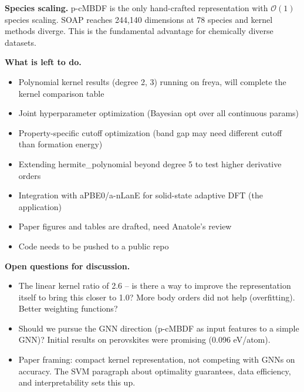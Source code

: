 \documentclass[11pt]{article}
\begin{document}
\textbf{Species scaling.} p-cMBDF is the only hand-crafted representation with $\mathcal{O}(1)$ species scaling. SOAP reaches 244,140 dimensions at 78 species and kernel methods diverge. This is the fundamental advantage for chemically diverse datasets.

\textbf{What is left to do.}
\begin{itemize}[nosep]
    \item Polynomial kernel results (degree 2, 3) running on freya, will complete the kernel comparison table
    \item Joint hyperparameter optimization (Bayesian opt over all continuous params)
    \item Property-specific cutoff optimization (band gap may need different cutoff than formation energy)
    \item Extending hermite\_polynomial beyond degree 5 to test higher derivative orders
    \item Integration with aPBE0/a-nLanE for solid-state adaptive DFT (the application)
    \item Paper figures and tables are drafted, need Anatole's review
    \item Code needs to be pushed to a public repo
\end{itemize}

\textbf{Open questions for discussion.}
\begin{itemize}[nosep]
    \item The linear kernel ratio of 2.6 -- is there a way to improve the representation itself to bring this closer to 1.0? More body orders did not help (overfitting). Better weighting functions?
    \item Should we pursue the GNN direction (p-cMBDF as input features to a simple GNN)? Initial results on perovskites were promising (0.096 eV/atom).
    \item Paper framing: compact kernel representation, not competing with GNNs on accuracy. The SVM paragraph about optimality guarantees, data efficiency, and interpretability sets this up.
\end{itemize}
\end{document}
